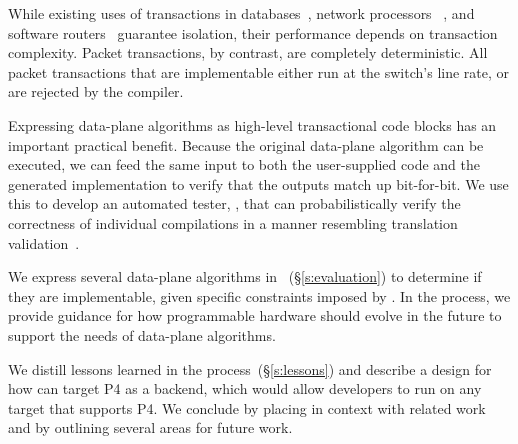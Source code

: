 While existing uses of transactions in databases~\cite{db_trans}, network
processors ~\cite{npus}, and software routers~\cite{click} guarantee isolation,
their performance depends on transaction complexity. Packet transactions, by
contrast, are completely deterministic. All packet transactions that are
implementable either run at the switch's line rate, or are rejected by the
compiler.

Expressing data-plane algorithms as high-level transactional code blocks has
an important practical benefit. Because the original data-plane algorithm can
be executed, we can feed the same input to both the user-supplied code and the
generated implementation to verify that the outputs match up bit-for-bit. We
use this to develop an automated tester, \tester , that can probabilistically
verify the correctness of individual compilations in a manner resembling
translation validation~\cite{necula_validation}.

We express several data-plane algorithms in \pktlanguage~(\S\ref{s:evaluation})
to determine if they are implementable, given specific constraints imposed by
\absmachine. In the process, we provide guidance for how programmable hardware
should evolve in the future to support the needs of data-plane algorithms.

We distill lessons learned in the process~(\S\ref{s:lessons}) and describe a
design for how \pktlanguage can target P4 as a backend, which would allow
developers to run \pktlanguage on any target that supports P4. We conclude by
placing \pktlanguage in context with related work and by outlining several
areas for future work.
